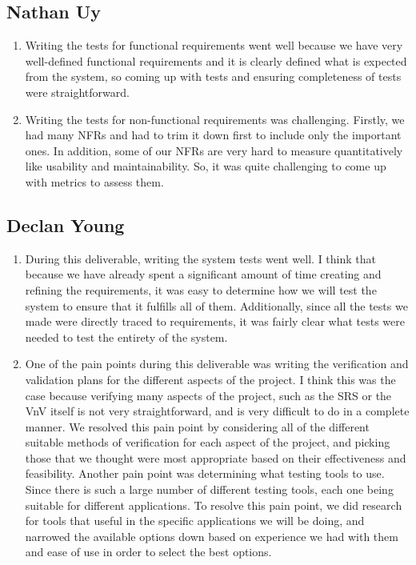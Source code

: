 \documentclass[12pt, titlepage]{article}
\begin{document}
\subsection*{Nathan Uy}

\begin{enumerate}
    \item Writing the tests for functional requirements went well because we have very well-defined functional requirements and it is clearly defined what is expected from the system, so coming up with tests and ensuring completeness of tests were straightforward.
    \item Writing the tests for non-functional requirements was challenging. Firstly, we had many NFRs and had to trim it down first to include only the important ones. In addition, some of our NFRs are very hard to measure quantitatively like usability and maintainability. So, it was quite challenging to come up with metrics to assess them.

\end{enumerate}  

\subsection*{Declan Young}

\begin{enumerate}
    \item During this deliverable, writing the system tests went well. I think that because we have already spent a significant amount of time creating and refining the requirements, it was easy to determine how we will test the system to ensure that it fulfills all of them. Additionally, since all the tests we made were directly traced to requirements, it was fairly clear what tests were needed to test the entirety of the system.
    \item One of the pain points during this deliverable was writing the verification and validation plans for the different aspects of the project. I think this was the case because verifying many aspects of the project, such as the SRS or the VnV itself is not very straightforward, and is very difficult to do in a complete manner. We resolved this pain point by considering all of the different suitable methods of verification for each aspect of the project, and picking those that we thought were most appropriate based on their effectiveness and feasibility. Another pain point was determining what testing tools to use. Since there is such a large number of different testing tools, each one being suitable for different applications. To resolve this pain point, we did research for tools that useful in the specific applications we will be doing, and narrowed the available options down based on experience we had with them and ease of use in order to select the best options.
\end{enumerate}  
\end{document}
